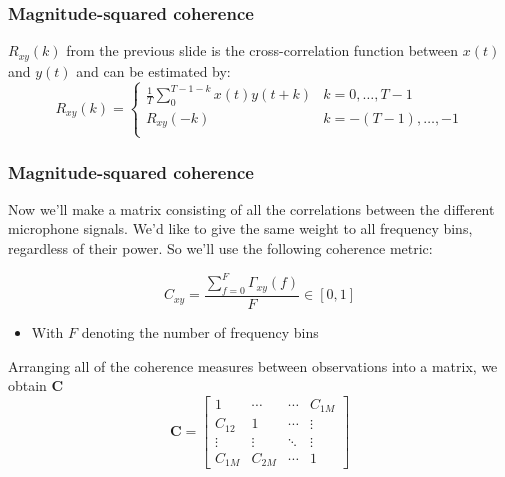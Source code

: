\documentclass[aspectratio=169]{beamer}
\begin{document}
\begin{frame}
\frametitle{Magnitude-squared coherence}
$R_{xy}(k)$ from the previous slide is the cross-correlation function between $x(t)$ and $y(t)$ and can be estimated by:
\begin{equation}
    R_{xy}(k) = 
    \begin{cases}
    \frac 1T \sum_0^{T-1-k} x(t)y(t+k)  &k=0,\dots,T-1 \\
    R_{xy}(-k)  &k=-(T-1),\dots,-1 \\

\end{cases}
\end{equation}
    
\end{frame}

\begin{frame}
\frametitle{Magnitude-squared coherence}

Now we'll make a matrix consisting of all the correlations between the different microphone signals. We'd like to give the same weight to all frequency bins, regardless of their power. So we'll use the following coherence metric:

    \begin{equation}
    C_{xy} = \frac{\sum_{f=0}^{F} \Gamma_{xy}(f)}{F} \in [0,1]
    \end{equation}
    \begin{itemize}
        \item With $F$ denoting the number of frequency bins
    \end{itemize}
    Arranging all of the coherence measures between observations into a matrix, we obtain $\pmb C$
    \begin{equation}
        \pmb C=
        \begin{bmatrix}
        1 & \cdots & \cdots & C_{1M} \\
        C_{12} & 1 & \cdots &\vdots \\
        \vdots& \vdots& \ddots &\vdots \\
        C_{1M} & C_{2M} & \cdots & 1
        \end{bmatrix}
    \end{equation}
    
\end{frame}
\end{document}
